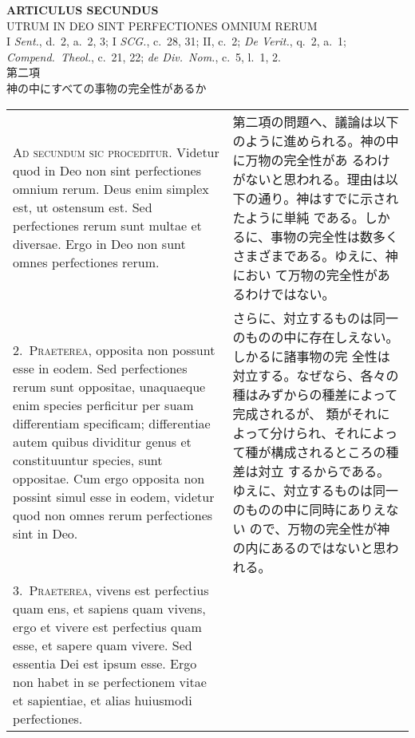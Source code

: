 \documentclass[10pt]{jsarticle}
\begin{document}
\newpage
{}

\begin{center}
 {\Large {\bf ARTICULUS SECUNDUS}}\\
 {\large UTRUM IN DEO SINT PERFECTIONES OMNIUM RERUM}\\
 {\footnotesize I {\itshape Sent.}, d.~2, a.~2, 3; I {\itshape SCG.},
 c.~28, 31; II, c.~2; {\itshape De Verit.}, q.~2, a.~1; {\itshape
 Compend.~Theol.}, c.~21, 22; {\itshape de Div.~Nom.}, c.~5, l.~1, 2.}\\
 {\Large 第二項\\神の中にすべての事物の完全性があるか }
\end{center}

\begin{longtable}{p{21em}p{21em}}

 

{\huge A}{\scshape d secundum sic proceditur}. Videtur quod in Deo non
sint perfectiones omnium rerum. Deus enim simplex est, ut ostensum
est. Sed perfectiones rerum sunt multae et diversae. Ergo in Deo non
sunt omnes perfectiones rerum.  


&

第二項の問題へ、議論は以下のように進められる。神の中に万物の完全性があ
るわけがないと思われる。理由は以下の通り。神はすでに示されたように単純
である。しかるに、事物の完全性は数多くさまざまである。ゆえに、神におい
て万物の完全性があるわけではない。

\\

2.~{\scshape Praeterea}, opposita non possunt esse in eodem. Sed
perfectiones rerum sunt oppositae, unaquaeque enim species perficitur
per suam differentiam specificam; differentiae autem quibus dividitur
genus et constituuntur species, sunt oppositae. Cum ergo opposita non
possint simul esse in eodem, videtur quod non omnes rerum perfectiones
sint in Deo.  


&

さらに、対立するものは同一のものの中に存在しえない。しかるに諸事物の完
全性は対立する。なぜなら、各々の種はみずからの種差によって完成されるが、
類がそれによって分けられ、それによって種が構成されるところの種差は対立
するからである。ゆえに、対立するものは同一のものの中に同時にありえない
ので、万物の完全性が神の内にあるのではないと思われる。

\\

3.~{\scshape Praeterea}, vivens est perfectius quam ens, et sapiens
quam vivens, ergo et vivere est perfectius quam esse, et sapere quam
vivere. Sed essentia Dei est ipsum esse. Ergo non habet in se
perfectionem vitae et sapientiae, et alias huiusmodi perfectiones.


\end{longtable}
\end{document}
